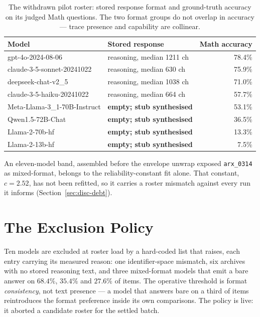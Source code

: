 \begin{table}[htbp]
\centering
\caption{The withdrawn pilot roster: stored response format and
ground-truth accuracy on its judged Math questions. The two format
groups do not overlap in accuracy --- trace presence and capability
are collinear.}
\label{tab:model-roster-pilot}
\begin{tabular}{llr}
\toprule
Model & Stored response & Math accuracy \\
\midrule
gpt-4o-2024-08-06 & reasoning, median 1211 ch & 78.4\% \\
claude-3-5-sonnet-20241022 & reasoning, median 630 ch & 75.9\% \\
deepseek-chat-v2\_5 & reasoning, median 1038 ch & 71.0\% \\
claude-3-5-haiku-20241022 & reasoning, median 664 ch & 57.7\% \\
\addlinespace
Meta-Llama-3\_1-70B-Instruct & \textbf{empty; stub synthesised} & 53.1\% \\
Qwen1.5-72B-Chat & \textbf{empty; stub synthesised} & 36.5\% \\
Llama-2-70b-hf & \textbf{empty; stub synthesised} & 13.3\% \\
Llama-2-13b-hf & \textbf{empty; stub synthesised} & 7.5\% \\
\bottomrule
\end{tabular}
\end{table}

An eleven-model band, assembled before the envelope unwrap exposed
\texttt{arx\_0314} as mixed-format, belongs to the reliability-constant fit
alone. That constant, $c = 2.52$, has not been refitted, so it carries a roster
mismatch against every run it informs (Section~\ref{sec:disc-debt}).

\section{The Exclusion Policy}\label{sec:roster-exclusion}

Ten models are excluded at roster load by a hard-coded list that raises, each
entry carrying its measured reason: one identifier-space mismatch, six archives
with no stored reasoning text, and three mixed-format models that emit a bare
answer on $68.4\%$, $35.4\%$ and $27.6\%$ of items. The operative threshold is
format \emph{consistency}, not text presence --- a model that answers bare on a
third of items reintroduces the format preference inside its own comparisons.
The policy is live: it aborted a candidate roster for the settled batch.

